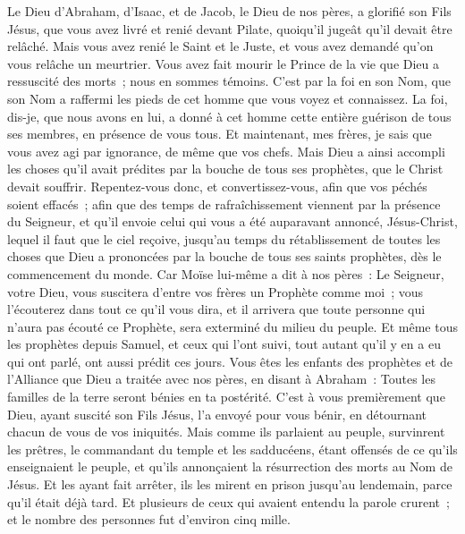 \begin{multicols}{2}
Le Dieu d'Abraham, d'Isaac, et de Jacob, le Dieu de nos pères, a glorifié son Fils Jésus, que vous avez livré et renié devant Pilate, quoiqu'il jugeât qu'il devait être relâché.
Mais vous avez renié le Saint et le Juste, et vous avez demandé qu'on vous relâche un meurtrier.
Vous avez fait mourir le Prince de la vie que Dieu a ressuscité des morts~; nous en sommes témoins.
C'est par la foi en son Nom, que son Nom a raffermi les pieds de cet homme que vous voyez et connaissez. La foi, dis-je, que nous avons en lui, a donné à cet homme cette entière guérison de tous ses membres, en présence de vous tous.
Et maintenant, mes frères, je sais que vous avez agi par ignorance, de même que vos chefs.
Mais Dieu a ainsi accompli les choses qu'il avait prédites par la bouche de tous ses prophètes, que le Christ devait souffrir.
Repentez-vous donc, et convertissez-vous, afin que vos péchés soient effacés~;
afin que des temps de rafraîchissement viennent par la présence du Seigneur, et qu'il envoie celui qui vous a été auparavant annoncé, Jésus-Christ,
lequel il faut que le ciel reçoive, jusqu'au temps du rétablissement de toutes les choses que Dieu a prononcées par la bouche de tous ses saints prophètes, dès le commencement du monde.
Car Moïse lui-même a dit à nos pères~: Le Seigneur, votre Dieu, vous suscitera d'entre vos frères un Prophète comme moi~; vous l'écouterez dans tout ce qu'il vous dira,
et il arrivera que toute personne qui n'aura pas écouté ce Prophète, sera exterminé du milieu du peuple.
Et même tous les prophètes depuis Samuel, et ceux qui l'ont suivi, tout autant qu'il y en a eu qui ont parlé, ont aussi prédit ces jours.
Vous êtes les enfants des prophètes et de l'Alliance que Dieu a traitée avec nos pères, en disant à Abraham~: Toutes les familles de la terre seront bénies en ta postérité.
C'est à vous premièrement que Dieu, ayant suscité son Fils Jésus, l'a envoyé pour vous bénir, en détournant chacun de vous de vos iniquités.
\VerseOne{}Mais comme ils parlaient au peuple, survinrent les prêtres, le commandant du temple et les sadducéens,
étant offensés de ce qu'ils enseignaient le peuple, et qu'ils annonçaient la résurrection des morts au Nom de Jésus.
Et les ayant fait arrêter, ils les mirent en prison jusqu'au lendemain, parce qu'il était déjà tard.
Et plusieurs de ceux qui avaient entendu la parole crurent~; et le nombre des personnes fut d'environ cinq mille.

\end{multicols}
